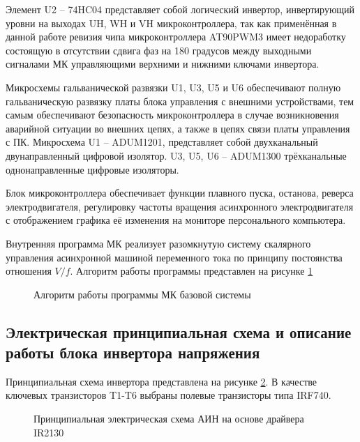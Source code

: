         Элемент U2 – 74HC04 представляет собой логический инвертор,
        инвертирующий уровни на выходах UH, WH и VH микроконтроллера, так как
        применённая в данной работе ревизия чипа микроконтроллера AT90PWM3
        имеет недоработку состоящую в отсутствии  сдвига фаз на 180 градусов
        между выходными сигналами МК управляющими верхними и нижними ключами
        инвертора.
        
        Микросхемы гальванической развязки U1, U3, U5 и U6 обеспечивают полную
        гальваническую развязку платы блока управления с внешними устройствами,
        тем самым обеспечивают безопасность микроконтроллера в случае
        возникновения аварийной ситуации во внешних цепях, а также в цепях
        связи платы управления с ПК. Микросхема U1 – ADUM1201, представляет
        собой двухканальный двунаправленный цифровой изолятор. U3, U5, U6 –
        ADUM1300 трёхканальные однонаправленные цифровые изоляторы.
        
        Блок микроконтроллера обеспечивает функции плавного пуска, останова,
        реверса электродвигателя, регулировку частоты вращения асинхронного
        электродвигателя с отображением графика её изменения на мониторе
        персонального компьютера.
        
        Внутренняя программа МК реализует разомкнутую систему скалярного
        управления асинхронной машиной переменного тока по принципу постоянства
        отношения $V/f$. Алгоритм работы программы представлен на рисунке
        \ref{fig:old-algorithm}

        \begin{figure}
            \caption{Алгоритм работы программы МК базовой системы}
            \label{fig:old-algorithm}
        \end{figure}


    \subsection{Электрическая принципиальная схема и описание работы блока
        инвертора напряжения}

        Принципиальная схема инвертора представлена на рисунке
        \ref{fig:power-block-schematic}. В качестве ключевых транзисторов T1-T6
        выбраны полевые транзисторы типа IRF740.
        
        \begin{figure}
            \caption{Принципиальная электрическая схема АИН на основе драйвера
                IR2130}
            \label{fig:power-block-schematic}
        \end{figure}
        
